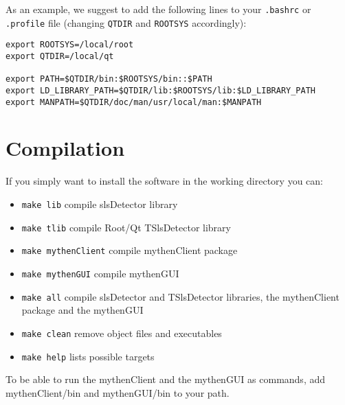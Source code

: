 \documentclass{report}
\begin{document}
As an example, we suggest to add the following lines to your \verb|.bashrc| or \verb|.profile| file (changing \verb|QTDIR| and \verb|ROOTSYS| accordingly):
\begin{verbatim}
export ROOTSYS=/local/root
export QTDIR=/local/qt

export PATH=$QTDIR/bin:$ROOTSYS/bin::$PATH
export LD_LIBRARY_PATH=$QTDIR/lib:$ROOTSYS/lib:$LD_LIBRARY_PATH
export MANPATH=$QTDIR/doc/man/usr/local/man:$MANPATH
\end{verbatim}

\section{Compilation} 
If you simply want to install the software in the working directory you can:
\begin{itemize}
\item \verb=make lib=     	compile slsDetector library
\item \verb=make tlib=          	compile Root/Qt TSlsDetector library
\item \verb=make mythenClient=  	compile mythenClient package
\item \verb=make mythenGUI=	compile mythenGUI
\item \verb=make all=	compile slsDetector and TSlsDetector libraries, the mythenClient package and the mythenGUI
\item \verb=make clean=              remove object files and executables
\item \verb=make help=               lists possible targets
\end{itemize}

To be able to run the mythenClient and the mythenGUI as commands, add mythenClient/bin and mythenGUI/bin to your path.
\end{document}
